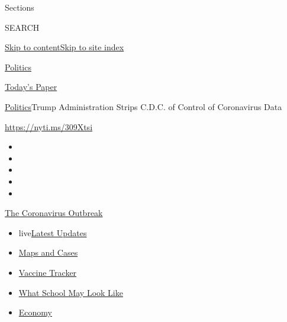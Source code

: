 Sections

SEARCH

\protect\hyperlink{site-content}{Skip to
content}\protect\hyperlink{site-index}{Skip to site index}

\href{https://www.nytimes.com/section/politics}{Politics}

\href{https://myaccount.nytimes.com/auth/login?response_type=cookie\&client_id=vi}{}

\href{https://www.nytimes.com/section/todayspaper}{Today's Paper}

\href{/section/politics}{Politics}\textbar{}Trump Administration Strips
C.D.C. of Control of Coronavirus Data

\url{https://nyti.ms/309Xtsi}

\begin{itemize}
\item
\item
\item
\item
\item
\end{itemize}

\href{https://www.nytimes.com/news-event/coronavirus?action=click\&pgtype=Article\&state=default\&region=TOP_BANNER\&context=storylines_menu}{The
Coronavirus Outbreak}

\begin{itemize}
\tightlist
\item
  live\href{https://www.nytimes.com/2020/08/01/world/coronavirus-covid-19.html?action=click\&pgtype=Article\&state=default\&region=TOP_BANNER\&context=storylines_menu}{Latest
  Updates}
\item
  \href{https://www.nytimes.com/interactive/2020/us/coronavirus-us-cases.html?action=click\&pgtype=Article\&state=default\&region=TOP_BANNER\&context=storylines_menu}{Maps
  and Cases}
\item
  \href{https://www.nytimes.com/interactive/2020/science/coronavirus-vaccine-tracker.html?action=click\&pgtype=Article\&state=default\&region=TOP_BANNER\&context=storylines_menu}{Vaccine
  Tracker}
\item
  \href{https://www.nytimes.com/interactive/2020/07/29/us/schools-reopening-coronavirus.html?action=click\&pgtype=Article\&state=default\&region=TOP_BANNER\&context=storylines_menu}{What
  School May Look Like}
\item
  \href{https://www.nytimes.com/live/2020/07/31/business/stock-market-today-coronavirus?action=click\&pgtype=Article\&state=default\&region=TOP_BANNER\&context=storylines_menu}{Economy}
\end{itemize}

